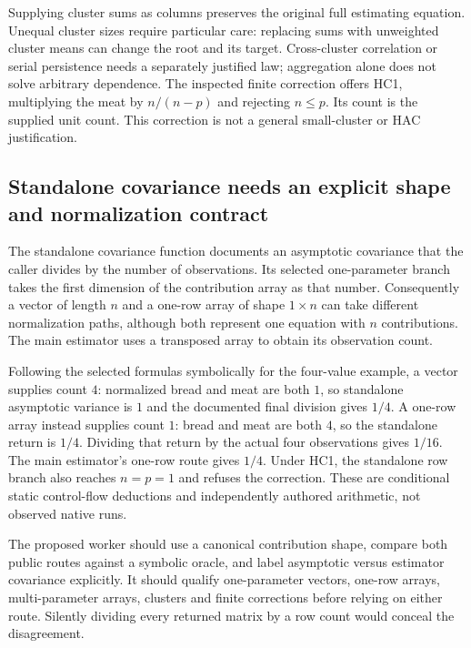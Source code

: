 Supplying cluster sums as columns preserves the original full estimating
equation. Unequal cluster sizes require particular care: replacing sums
with unweighted cluster means can change the root and its target.
Cross-cluster correlation or serial persistence needs a separately
justified law; aggregation alone does not solve arbitrary dependence.
The inspected finite correction offers HC1, multiplying the meat by
$n/(n-p)$ and rejecting $n\leq p$. Its count is the supplied unit count.
This correction is not a general small-cluster or HAC justification.
\citep{exec24_delicatessen_source,exec24_delicatessen_choice}

\subsection{Standalone covariance needs an explicit shape and normalization contract}
The standalone covariance function documents an asymptotic covariance
that the caller divides by the number of observations. Its selected
one-parameter branch takes the first dimension of the contribution array
as that number. Consequently a vector of length $n$ and a one-row array
of shape $1\times n$ can take different normalization paths, although
both represent one equation with $n$ contributions. The main estimator
uses a transposed array to obtain its observation count.
\citep{exec24_delicatessen_source}

Following the selected formulas symbolically for the four-value example,
a vector supplies count $4$: normalized bread and meat are both $1$,
so standalone asymptotic variance is $1$ and the documented final division
gives $1/4$. A one-row array instead supplies count $1$: bread and meat
are both $4$, so the standalone return is $1/4$. Dividing that return by
the actual four observations gives $1/16$. The main estimator's one-row
route gives $1/4$. Under HC1, the standalone row branch also reaches
$n=p=1$ and refuses the correction. These are conditional static
control-flow deductions and independently authored arithmetic, not
observed native runs.~\citep{exec24_delicatessen_source,exec24_delicatessen_choice}

The proposed worker should use a canonical contribution shape, compare
both public routes against a symbolic oracle, and label asymptotic versus
estimator covariance explicitly. It should qualify one-parameter vectors,
one-row arrays, multi-parameter arrays, clusters and finite corrections
before relying on either route. Silently dividing every returned matrix
by a row count would conceal the disagreement.
\citep{exec24_delicatessen_choice}


